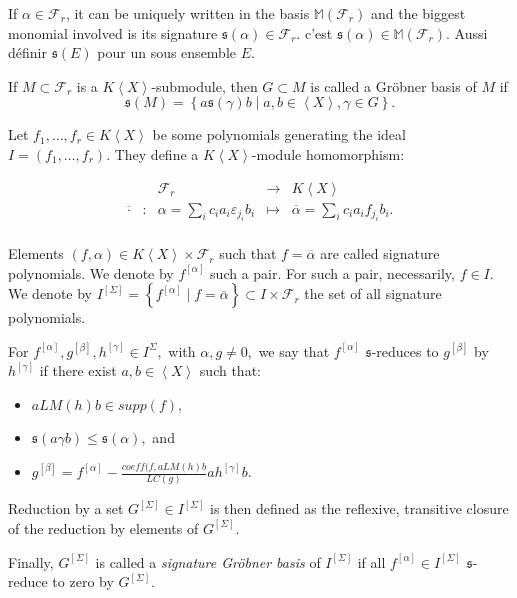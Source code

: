 \documentclass[sigconf]{acmart}
\theoremstyle{plain}
\theoremstyle{definition}
\theoremstyle{remark}
\newcommand{\MM}{\mathbb M}
\newcommand{\LC}{LC}
\newcommand{\LM}{LM}
\newcommand\fixmecc[1]{{\color{red}{\underline{\bf C:}} #1}}
\newcommand{\KX}{K \left\langle X \right\rangle}
\begin{document}
If $\alpha \in \mathscr{F}_r$, it can be uniquely
written in the basis 
$\MM \left( \mathscr{F}_r \right) $
and the biggest monomial
involved is its signature
$\mathfrak{s}(\alpha) \in
\mathscr{F}_r$.
\fixmecc{c'est $\mathfrak{s}(\alpha) \in \MM (\mathscr{F}_r)$. Aussi définir
$\mathfrak{s}(E)$ pour un sous ensemble $E$.}

If $M \subset \mathscr{F}_r$
is a $\KX$-submodule,
then $G \subset M$ is called
a Gröbner basis of $M$ if
\[\mathfrak{s}(M)= \left\lbrace a \mathfrak{s}(\gamma) b \mid a,b \in \left\langle X \right\rangle, \gamma \in G \right\rbrace. \]

Let $f_1,\dots,f_r \in \KX$
be some polynomials
generating the ideal $I=(f_1,\dots,f_r).$
They define a 
$\KX$-module homomorphism:

\[
\begin{array}{ccccc}
&& \mathscr{F}_r & \rightarrow & \KX \\
\overline{\cdot}& : &\alpha = \sum_i c_i a_i \varepsilon_{j_i} b_i&\mapsto& \overline{\alpha}=\sum_i c_i a_i f_{j_i} b_i. \\
\end{array}\]

Elements $(f,\alpha) \in \KX \times \mathscr{F}_r$
such that $f=\overline{\alpha}$
are called signature polynomials.
We denote by $f^{[\alpha]}$
such a pair. 
For such a pair, necessarily,
$f \in I.$
We denote by $I^{[\Sigma ]}=\left\lbrace f^{[\alpha]} \mid f=\overline{\alpha} \right\rbrace \subset I \times \mathscr{F}_r$
the set of all signature
polynomials.

For $f^{[\alpha]},g^{[\beta]},
h^{[\gamma]} \in I^{\Sigma},$
with $\alpha, g \neq 0,$
we say that 
$f^{[\alpha]}$ $\mathfrak{s}$-reduces to
$g^{[\beta]}$ by
$h^{[\gamma]}$
if there exist $a,b \in 
\left\langle X \right\rangle$
such that:
\begin{itemize}
\item $a \LM(h)b \in supp(f),$
\item $\mathfrak{s}(a \gamma b) \leq \mathfrak{s}(\alpha),$ and
\item $g^{[\beta]}=f^{[\alpha]}-\frac{coeff(f,a \LM(h)b}{\LC(g)} a h^{[\gamma]}b.$
\end{itemize}
Reduction by a set $G^{[\Sigma]} \in I^{[\Sigma]}$
is then defined as the 
reflexive, transitive closure
of the reduction by elements
of $G^{[\Sigma]} $.

Finally, $G^{[\Sigma]} $
is called a \textit{signature
Gröbner basis} of $I^{[\Sigma]}$ if all
$f^{[\alpha]} \in I^{[\Sigma]}$ $\mathfrak{s}$-reduce to zero by $G^{[\Sigma]}.$
\end{document}
